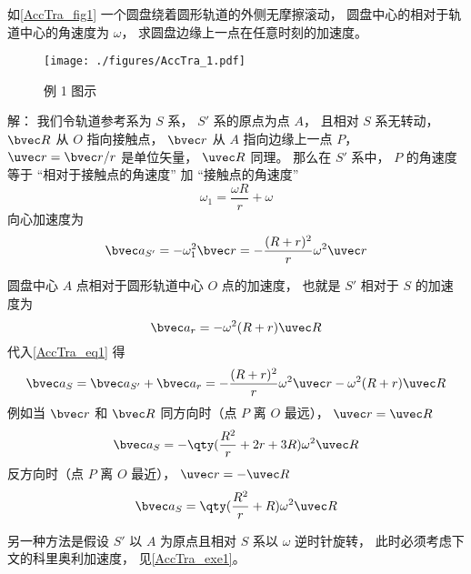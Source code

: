 \begin{example}{}\label{AccTra_ex1}
如\autoref{AccTra_fig1} 一个圆盘绕着圆形轨道的外侧无摩擦滚动， 圆盘中心的相对于轨道中心的角速度为 $\omega$， 求圆盘边缘上一点在任意时刻的加速度。
\begin{figure}[ht]
\centering
\texttt{[image: ./figures/AccTra\_1.pdf]}
\caption{例 1 图示} \label{AccTra_fig1}
\end{figure}

解： 我们令轨道参考系为 $S$ 系， $S'$ 系的原点为点 $A$， 且相对 $S$ 系无转动， $\bvec R$ 从 $O$ 指向接触点， $\bvec r$ 从 $A$ 指向边缘上一点 $P$， $\uvec r = \bvec r/r$ 是单位矢量， $\uvec R$ 同理。 那么在 $S'$ 系中， $P$ 的角速度等于 “相对于接触点的角速度” 加 “接触点的角速度”
\begin{equation}
\omega_1 = \frac{\omega R}{r} + \omega
\end{equation}
向心加速度为
\begin{equation}
\bvec a_{S'} = -\omega_1^2 \bvec r = -\frac{(R+r)^2}{r} \omega^2\uvec r
\end{equation}

圆盘中心 $A$ 点相对于圆形轨道中心 $O$ 点的加速度， 也就是 $S'$ 相对于 $S$ 的加速度为
\begin{equation}
\bvec a_r = -\omega^2 (R + r)\uvec R
\end{equation}
代入\autoref{AccTra_eq1} 得
\begin{equation}
\bvec a_S = \bvec a_{S'} + \bvec a_r = -\frac{(R+r)^2}{r} \omega^2\uvec r -\omega^2 (R + r)\uvec R
\end{equation}
例如当 $\bvec r$ 和 $\bvec R$ 同方向时（点 $P$ 离 $O$ 最远）， $\uvec r = \uvec R$
\begin{equation}
\bvec a_S = -\qty(\frac{R^2}{r} + 2r + 3R)\omega^2 \uvec R
\end{equation}
反方向时（点 $P$ 离 $O$ 最近）， $\uvec r = -\uvec R$
\begin{equation}
\bvec a_S = \qty(\frac{R^2}{r} + R)\omega^2\uvec R
\end{equation}



另一种方法是假设 $S'$ 以 $A$ 为原点且相对 $S$ 系以 $\omega$ 逆时针旋转， 此时必须考虑下文的科里奥利加速度， 见\autoref{AccTra_exe1}。
\end{example}

